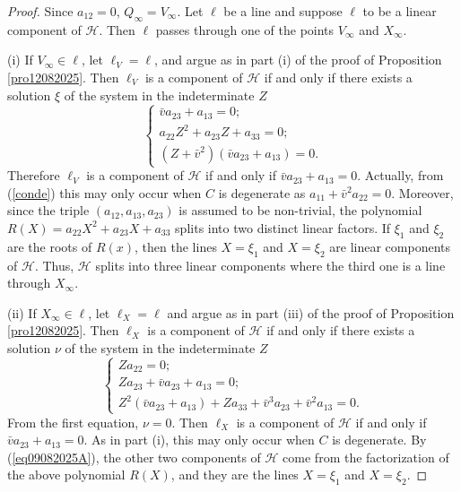 \documentclass[sn-mathphys-num]{sn-jnl}%
\begin{document}
\begin{proof} Since $a_{12}=0$, $Q_\infty=V_\infty$.
Let $\ell$ be a line and suppose $\ell$ to be a linear component of $\mathcal{H}$. Then $\ell$ passes through one of the points $V_\infty$ and $X_\infty$.

(i)  If $V_\infty\in \ell$, let $\ell_V=\ell$, and  argue as in part (i) of the proof of Proposition \ref{pro12082025}.
Then $\ell_V$ is a component of $\mathcal{H}$ if and only if there exists a solution $\xi$ of the system in the indeterminate $Z$
\begin{equation*}
\label{eq09082025AAA}
\begin{cases}
\bar{v}a_{23}+a_{13}=0;\\
a_{22}Z^2+a_{23}Z+a_{33}=0;\\
(Z+\bar{v}^2)(\bar{v}a_{23}+a_{13})=0.
\end{cases}
\end{equation*}
Therefore $\ell_V$ is a component of $\mathcal{H}$ if and only if $\bar{v}a_{23}+a_{13}=0$. Actually, from (\ref{conde}) this may only occur when $C$ is degenerate as $a_{11}+\bar{v}^2a_{22}=0$. Moreover, since the triple $(a_{12},a_{13},a_{23})$ is assumed to be non-trivial, the polynomial $R(X)=a_{22}X^2+a_{23}X+a_{33}$ splits into two distinct linear factors. If $\xi_1$ and $\xi_2$ are the roots of $R(x)$, then the lines $X=\xi_1$ and $X=\xi_2$ are linear components of $\mathcal{H}$. Thus, $\mathcal{H}$ splits into three linear components where the third one is a line through $X_\infty$.

(ii) If $X_\infty\in \ell$, let $\ell_X=\ell$ and argue as in part (iii) of the proof of Proposition \ref{pro12082025}.  Then $\ell_X$ is a component of $\mathcal{H}$ if and only if there exists a solution $\nu$ of the system in the indeterminate $Z$
\begin{equation*}
\label{eq09082025CC}
\begin{cases}Za_{22}=0; \\
Za_{23}+\bar{v}a_{23}+a_{13}=0;\\
Z^2(\bar{v}a_{23}+a_{13})+Za_{33}+\bar{v}^3a_{23}+\bar{v}^2a_{13}=0.
\end{cases}
\end{equation*}
From the first equation, $\nu=0$. Then $\ell_X$ is a component of $\mathcal{H}$ if and only if $\bar{v}a_{23}+a_{13}=0$.
As in part (i), this may only occur when $C$ is degenerate. By (\ref{eq09082025A}),
the other two components of $\mathcal{H}$ come from the factorization of the above polynomial $R(X)$, and they are the lines $X=\xi_1$ and $X=\xi_2$.  
\end{proof}
\end{document}
